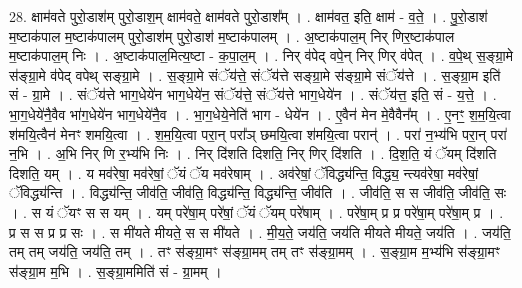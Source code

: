 \documentclass[17pt]{extarticle}
\begin{document}
28. क्षाम॑वते पुरो॒डाश॑म् पुरो॒डाश॒म् क्षाम॑वते॒ क्षाम॑वते पुरो॒डाश᳚म् । . क्षाम॑वत॒ इति॒ क्षाम॑ - व॒ते॒ । . पु॒रो॒डाश॑ म॒ष्टाक॑पाल म॒ष्टाक॑पालम् पुरो॒डाश॑म् पुरो॒डाश॑ म॒ष्टाक॑पालम् । . अ॒ष्टाक॑पाल॒म् निर् णिर॒ष्टाक॑पाल म॒ष्टाक॑पाल॒म् निः । . अ॒ष्टाक॑पाल॒मित्य॒ष्टा - क॒पा॒ल॒म् । . निर् व॑पेद् वपे॒न् निर् णिर् व॑पेत् । . व॒पे॒थ् स॒ङ्ग्रा॒मे स॑ङ्ग्रा॒मे व॑पेद् वपेथ् सङ्ग्रा॒मे । . स॒ङ्ग्रा॒मे संॅय॑त्ते॒ संॅय॑त्ते सङ्ग्रा॒मे स॑ङ्ग्रा॒मे संॅय॑त्ते । . स॒ङ्ग्रा॒म इति॑ सं - ग्रा॒मे । . संॅय॑त्ते भाग॒धेये॑न भाग॒धेये॑न॒ संॅय॑त्ते॒ संॅय॑त्ते भाग॒धेये॑न । . संॅय॑त्त॒ इति॒ सं - य॒त्ते॒ । . भा॒ग॒धेये॑नै॒वैव भा॑ग॒धेये॑न भाग॒धेये॑नै॒व । . भा॒ग॒धेये॒नेति॑ भाग - धेये॑न । . ए॒वैन॑ मेन मे॒वैवैन᳚म् । . ए॒नꣳ॒॒ श॒म॒यि॒त्वा श॑मयि॒त्वैन॑ मेनꣳ शमयि॒त्वा । . श॒म॒यि॒त्वा परा॒न् परा᳚ञ् छमयि॒त्वा श॑मयि॒त्वा परान्॑ । . परा॑ न॒भ्य॑भि परा॒न् परा॑ न॒भि । . अ॒भि निर् णि र॒भ्य॑भि निः । . निर् दि॑शति दिशति॒ निर् णिर् दि॑शति । . दि॒श॒ति॒ यं ॅयम् दि॑शति दिशति॒ यम् । . य मव॑रेषा॒ मव॑रेषां॒ ॅयं ॅय मव॑रेषाम् । . अव॑रेषां॒ ॅविद्ध्य॑न्ति॒ विद्ध्य॒ न्त्यव॑रेषा॒ मव॑रेषां॒ ॅविद्ध्य॑न्ति । . विद्ध्य॑न्ति॒ जीव॑ति॒ जीव॑ति॒ विद्ध्य॑न्ति॒ विद्ध्य॑न्ति॒ जीव॑ति । . जीव॑ति॒ स स जीव॑ति॒ जीव॑ति॒ सः । . स यं ॅयꣳ स स यम् । . यम् परे॑षा॒म् परे॑षां॒ ॅयं ॅयम् परे॑षाम् । . परे॑षा॒म् प्र प्र परे॑षा॒म् परे॑षा॒म् प्र । . प्र स स प्र प्र सः । . स मी॑यते मीयते॒ स स मी॑यते । . मी॒य॒ते॒ जय॑ति॒ जय॑ति मीयते मीयते॒ जय॑ति । . जय॑ति॒ तम् तम् जय॑ति॒ जय॑ति॒ तम् । . तꣳ स॑ङ्ग्रा॒मꣳ स॑ङ्ग्रा॒मम् तम् तꣳ स॑ङ्ग्रा॒मम् । . स॒ङ्ग्रा॒म म॒भ्य॑भि स॑ङ्ग्रा॒मꣳ स॑ङ्ग्रा॒म म॒भि । . स॒ङ्ग्रा॒ममिति॑ सं - ग्रा॒मम् । \newline
\end{document}
